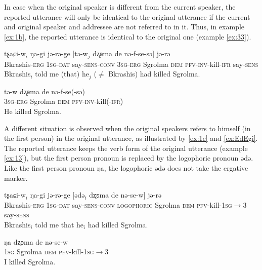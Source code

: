 \documentclass[oneside,a4paper,11pt]{article}
\newcommand{\ipa}[1]{{\phon #1}} %
\newcommand{\ipapl}[1]{{\phon #1}} %
\newcommand{\conv}{\textsc{conv}}
\newcommand{\dat}{\textsc{dat}}
\newcommand{\dem}{\textsc{dem}}
\newcommand{\evid}{\textsc{ifr}}
\newcommand{\erg}{\textsc{erg}}
\newcommand{\inv}{\textsc{inv}}
\newcommand{\prf}{\textsc{pfv}}
\newcommand{\sg}{\textsc{sg}}
\newcommand{\sens}{\textsc{sens}}
\begin{document}
In case when the original speaker is different from the current speaker, the reported utterance will only be identical to the original utterance if the current and original speaker and addressee are not referred to in it. Thus, in example \ref{ex:1b}, the reported utterance is identical to the original one (example \ref{ex:33}).


\begin{exe}
\ex \label{ex:1b}
\gll
	\ipa{tʂaɕi-w}$_i$ \ipa{ŋa-gi}	\ipa{jə-rə-ge} [\ipapl{tə-w}$_j$	\ipapl{dʐʚma} 	\ipapl{de} \ipapl{nə-f-se-sə}] \ipa{jə-rə}  \\
	{Bkrashis-\erg} {1\sg-\dat} {say-\sens-\conv} {3\sg-\erg} Sgrolma {\dem} {\prf-\inv-kill-\evid}  say-\sens\\ 
	\glt Bkrashis$_i$ told me (that) he$_j$ ($\ne$ Bkrashis) had killed Sgrolma.
\end{exe}


\begin{exe}
\ex \label{ex:33}
\gll
	\ipa{tə-w} \ipapl{dʐʚma} \ipapl{de} \ipapl{nə-f-se(-sə)} \\
	{3\sg-\erg} Sgrolma {\dem} {\prf-\inv-kill(-\evid)}\\ 
	\glt He killed Sgrolma.
\end{exe}

A different situation is observed when the original speakers refers to himself (in the first person) in the original utterance, as illustrated by \ref{ex:1c} and \ref{ex:EdEgi}.  The reported utterance keeps the verb form of the original utterance (example \ref{ex:13}), but the first person pronoun is replaced by the logophoric pronoun \ipa{ədə}. Like the first person pronoun \ipa{ŋa}, the logophoric \ipa{ədə} does not take the ergative marker.

\begin{exe}
\ex \label{ex:1c}
\gll
	\ipa{tʂaɕi-w}$_i$ \ipa{ŋa-gi}	\ipa{jə-rə-ge} [\ipapl{ədə}$_i$	\ipapl{dʐʚma} 	\ipapl{de} 	\ipapl{nə-se-w}] \ipa{jə-rə}  \\
	{Bkrashis-\erg} {1\sg-\dat} {say-\sens-\conv} \textsc{logophoric} Sgrolma {\dem} {\prf-kill-1\sg$\rightarrow$3} say-\sens\\ 
	\glt Bkrashis$_i$ told me that he$_i$ had killed Sgrolma.
\end{exe}


\begin{exe}
\ex \label{ex:13}
\gll
	\ipa{ŋa}	\ipapl{dʐʚma} 	\ipapl{de} 	\ipapl{nə-se-w} \\
	{1\sg} Sgrolma {\dem} {\prf-kill-1\sg$\rightarrow$3}\\ 
	\glt I killed Sgrolma.
\end{exe}
\end{document}
